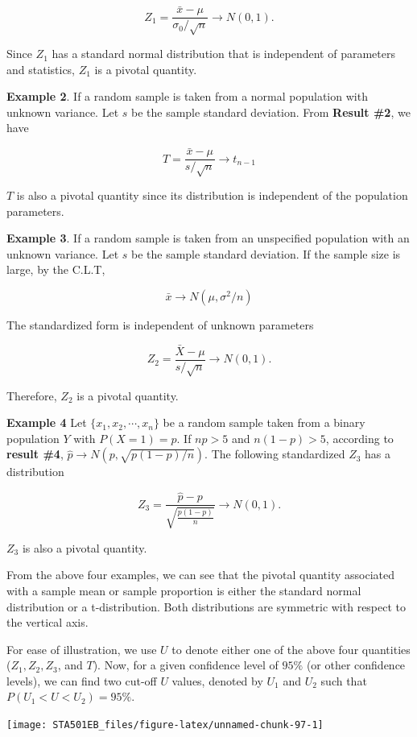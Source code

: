 \documentclass[
]{book}
\begin{document}
\[
Z_1 = \frac{\bar{x} - \mu}{\sigma_0/\sqrt{n}} \to N(0,1).
\]

Since \(Z_1\) has a standard normal distribution that is independent of parameters and statistics, \(Z_1\) is a pivotal quantity.

\textbf{Example 2}. If a random sample is taken from a normal population with unknown variance. Let \(s\) be the sample standard deviation. From \textbf{Result \#2}, we have

\[
T = \frac{\bar{x}-\mu}{s/\sqrt{n}} \to t_{n-1}
\]

\(T\) is also a pivotal quantity since its distribution is independent of the population parameters.

\textbf{Example 3}. If a random sample is taken from an unspecified population with an unknown variance. Let \(s\) be the sample standard deviation. If the sample size is large, by the C.L.T,

\[
\bar{x} \to N(\mu, \sigma^2/n) 
\]

The standardized form is independent of unknown parameters

\[
Z_2 = \frac{\bar{X}-\mu}{s/\sqrt{n}} \to N(0,1).
\]

Therefore, \(Z_2\) is a pivotal quantity.

\textbf{Example 4} Let \(\{ x_1, x_2, \cdots, x_n\}\) be a random sample taken from a binary population \(Y\) with \(P(X=1) = p\). If \(np > 5\) and \(n(1-p) >5\), according to \textbf{result \#4}, \(\hat{p} \to N(p, \sqrt{p(1-p)/n})\). The following standardized \(Z_3\) has a distribution

\[
Z_3 = \frac{\hat{p}-p}{\sqrt{\frac{p(1-p)}{n}}} \to N(0,1).
\]

\(Z_3\) is also a pivotal quantity.

From the above four examples, we can see that the pivotal quantity associated with a sample mean or sample proportion is either the standard normal distribution or a t-distribution. Both distributions are symmetric with respect to the vertical axis.

For ease of illustration, we use \(U\) to denote either one of the above four quantities (\(Z_1, Z_2, Z_3\), and \(T\)). Now, for a given confidence level of \(95\%\) (or other confidence levels), we can find two cut-off \(U\) values, denoted by \(U_1\) and \(U_2\) such that \(P(U_1 < U < U_2) = 95\%\).

\begin{center}\texttt{[image: STA501EB\_files/figure-latex/unnamed-chunk-97-1]} \end{center}
\end{document}
